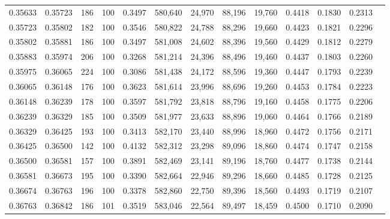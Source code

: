 \begin{tabular}{rrrrrrrrrrrrr}
0.35633 & 0.35723 &   186 & 100 &                                     0.3497 & 580,640 &  24,970 &  88,196 &  19,760 & 0.4418 & 0.1830 & 0.2313 \\
0.35723 & 0.35802 &   182 & 100 &                                     0.3546 & 580,822 &  24,788 &  88,296 &  19,660 & 0.4423 & 0.1821 & 0.2296 \\
0.35802 & 0.35881 &   186 & 100 &                                     0.3497 & 581,008 &  24,602 &  88,396 &  19,560 & 0.4429 & 0.1812 & 0.2279 \\
0.35883 & 0.35974 &   206 & 100 &                                     0.3268 & 581,214 &  24,396 &  88,496 &  19,460 & 0.4437 & 0.1803 & 0.2260 \\
0.35975 & 0.36065 &   224 & 100 &                                     0.3086 & 581,438 &  24,172 &  88,596 &  19,360 & 0.4447 & 0.1793 & 0.2239 \\
0.36065 & 0.36148 &   176 & 100 &                                     0.3623 & 581,614 &  23,996 &  88,696 &  19,260 & 0.4453 & 0.1784 & 0.2223 \\
0.36148 & 0.36239 &   178 & 100 &                                     0.3597 & 581,792 &  23,818 &  88,796 &  19,160 & 0.4458 & 0.1775 & 0.2206 \\
0.36239 & 0.36329 &   185 & 100 &                                     0.3509 & 581,977 &  23,633 &  88,896 &  19,060 & 0.4464 & 0.1766 & 0.2189 \\
0.36329 & 0.36425 &   193 & 100 &                                     0.3413 & 582,170 &  23,440 &  88,996 &  18,960 & 0.4472 & 0.1756 & 0.2171 \\
0.36425 & 0.36500 &   142 & 100 &                                     0.4132 & 582,312 &  23,298 &  89,096 &  18,860 & 0.4474 & 0.1747 & 0.2158 \\
0.36500 & 0.36581 &   157 & 100 &                                     0.3891 & 582,469 &  23,141 &  89,196 &  18,760 & 0.4477 & 0.1738 & 0.2144 \\
0.36581 & 0.36673 &   195 & 100 &                                     0.3390 & 582,664 &  22,946 &  89,296 &  18,660 & 0.4485 & 0.1728 & 0.2125 \\
0.36674 & 0.36763 &   196 & 100 &                                     0.3378 & 582,860 &  22,750 &  89,396 &  18,560 & 0.4493 & 0.1719 & 0.2107 \\
0.36763 & 0.36842 &   186 & 101 &                                     0.3519 & 583,046 &  22,564 &  89,497 &  18,459 & 0.4500 & 0.1710 & 0.2090 \\

\end{tabular}
